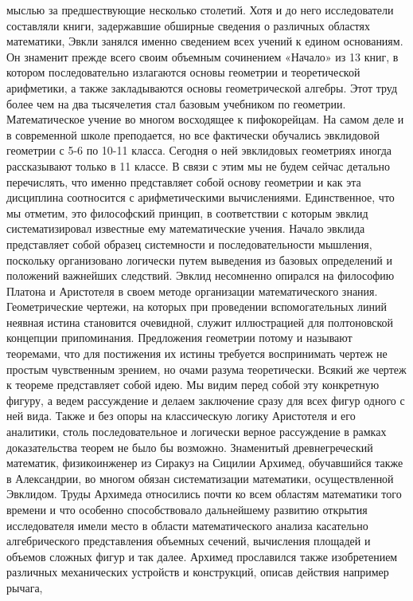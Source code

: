 мыслью за предшествующие несколько столетий. Хотя и до него исследователи
составляли книги, задержавшие обширные сведения о различных областях математики,
Эвкли занялся именно сведением всех учений к едином основаниям. Он знаменит
прежде всего своим объемным сочинением «Начало» из 13 книг, в котором
последовательно излагаются основы геометрии и теоретической арифметики, а также
закладываются основы геометрической алгебры. Этот труд более чем на два
тысячелетия стал базовым учебником по геометрии. Математическое учение во многом
восходящее к пифокорейцам. На самом деле и в современной школе преподается, но
все фактически обучались эвклидовой геометрии с 5-6 по 10-11 класса. Сегодня о
ней эвклидовых геометриях иногда рассказывают только в 11 классе. В связи с этим
мы не будем сейчас детально перечислять, что именно представляет собой основу
геометрии и как эта дисциплина соотносится с арифметическими вычислениями.
Единственное, что мы отметим, это философский принцип, в соответствии с которым
эвклид систематизировал известные ему математические учения. Начало эвклида
представляет собой образец системности и последовательности мышления, поскольку
организовано логически путем выведения из базовых определений и положений
важнейших следствий. Эвклид несомненно опирался на философию Платона и
Аристотеля в своем методе организации математического знания. Геометрические
чертежи, на которых при проведении вспомогательных линий неявная истина
становится очевидной, служит иллюстрацией для полтоновской концепции
припоминания. Предложения геометрии потому и называют теоремами, что для
постижения их истины требуется воспринимать чертеж не простым чувственным
зрением, но очами разума теоретически. Всякий же чертеж к теореме представляет
собой идею. Мы видим перед собой эту конкретную фигуру, а ведем рассуждение и
делаем заключение сразу для всех фигур одного с ней вида. Также и без опоры на
классическую логику Аристотеля и его аналитики, столь последовательное и
логически верное рассуждение в рамках доказательства теорем не было бы возможно.
Знаменитый древнегреческий математик, физикоинженер из Сиракуз на Сицилии
Архимед, обучавшийся также в Александрии, во многом обязан систематизации
математики, осуществленной Эвклидом. Труды Архимеда относились почти ко всем
областям математики того времени и что особенно способствовало дальнейшему
развитию открытия исследователя имели место в области математического анализа
касательно алгебрического представления объемных сечений, вычисления площадей и
объемов сложных фигур и так далее. Архимед прославился также изобретением
различных механических устройств и конструкций, описав действия например рычага,
